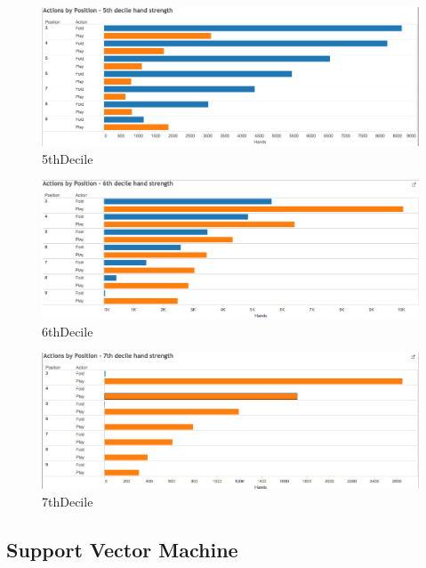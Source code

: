 \documentclass[twoside]{article}
\begin{document}
\begin{multicols}{2}
\begin{figure}[H]
  \centering
  \centerline{\includegraphics[width=1\columnwidth]{5thDecile.png}}
   \caption{5thDecile}
  \label{fig:5thDecile}
\end{figure}

\begin{figure}[H]
  \centering
  \centerline{\includegraphics[width=1\columnwidth]{6thDecile.png}}
   \caption{6thDecile}
  \label{fig:6thDecile}
\end{figure}

\begin{figure}[H]
  \centering
  \centerline{\includegraphics[width=1\columnwidth]{7thDecile.png}}
   \caption{7thDecile}
  \label{fig:7thDecile}
\end{figure}

\subsection{Support Vector Machine}


\end{multicols}
\end{document}
